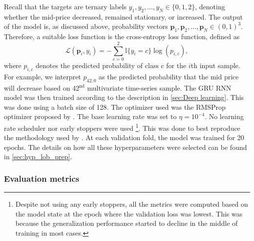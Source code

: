 \documentclass{statsmsc}
\begin{document}
{Recall that the targets are ternary labels $y_1,y_2,\dots,y_N \in \{0,1,2\}$, denoting whether the mid-price
decreased, remained stationary, or increased. The output of the model is, as discussed above,
probability vectors $\mathbf{p}_1, \mathbf{p}_2,\dots, \mathbf{p}_N \in
(0,1)^3$. Therefore, a suitable loss function is the cross-entropy loss
function, defined as
\begin{equation}
    \mathcal{L}(\mathbf{p}_i, y_i)=-\sum^{2}_{c=0} \mathbb{I}\{y_i=c\} \log \left( p_{i,c} \right),
\end{equation}
where $p_{i,c}$ denotes the predicted probability of class $c$ for the $i$th input sample.
For example, we interpret $p_{42,0}$ as the predicted probability that the mid price will decrease
based on 42$^{\textrm{nd}}$ multivariate time-series sample.
The \ac{GRU} \ac{RNN} model was then trained according to the description in
\cref{sec:Deep learning}. This was done using a batch size of 128. The optimizer used
was the RMSProp optimizer proposed by \cite{rmsprop}. The base learning rate was set to
$\eta=10^{-4}$. No learning rate scheduler nor early stoppers were used%
\footnote{%
    Despite not using any early stoppers,
    all the metrics were computed based on the model state at the epoch where the validation loss
    was lowest. This was because
    the generalization performance started to decline in the middle of training in most cases.
}.
This was done to best reproduce the methodology used by \cite{dain}.
At each validation fold, the model was trained for 20
epochs. The details on how all these hyperparameters were selected can be found in
\cref{sec:hyp_lob_prep}.

\subsubsection{Evaluation metrics}%
\label{ssub:Evaluation metrics}

}
\end{document}
